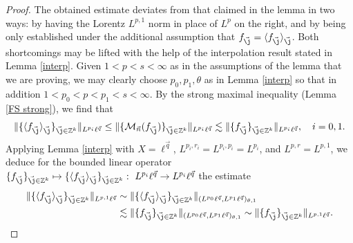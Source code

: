 \documentclass[10pt,a4paper]{amsart}
\newcommand{\Avee}[2]{\langle#1\rangle_{#2}}
\newcommand{\Norm}[2]{\|#1\|_{#2}}
\newcommand{\vj}{\vec{\textit{\j}}}
\newcommand{\vn}{\vec n}
\newcommand{\vq}{\vec q}
\begin{document}
\begin{proof}
The obtained estimate deviates from that claimed in the lemma in two ways: by having the Lorentz $L^{p,1}$ norm in place of $L^p$ on the right,
and by being only established under the additional assumption that $f_{\vj}=\Avee{f_{\vj} }{\vj}$. Both shortcomings may be lifted with the help of the interpolation result stated in Lemma \ref{interp}. Given $1<p<s<\infty$ as in the assumptions of the lemma that we are proving, we may clearly choose $p_0,p_1,\theta$ as in Lemma \ref{interp} so that in addition $1<p_0<p<p_1<s<\infty$. By the strong maximal inequality (Lemma \ref{FS strong}), we find that
\begin{equation*}
\Norm{\{\Avee{f_{\vj}}{\vj}\}_{\vj\in\mathbb Z^k}}{L^{p_i}\ell^{\vq}}
\leq \Norm{\{\mathcal M_{\vn}(f_{\vj})\}_{\vj\in\mathbb Z^k}}{L^{p_i}\ell^{\vq}}
\lesssim\Norm{\{f_{\vj}\}_{\vj\in\mathbb Z^k}}{L^{p_i}\ell^{\vq}},\quad i=0,1.
\end{equation*}
Applying Lemma \ref{interp} with $X=\ell^{\vq}$, $L^{p_i,r_i}=L^{p_i,p_i}=L^{p_i}$, and $L^{p,r}=L^{p,1}$, we deduce for the bounded linear operator $\{f_{\vj}\}_{\vj\in\mathbb Z^k}\mapsto\{\Avee{f_{\vj}}{\vj}\}_{\vj\in\mathbb Z^k}:\ L^{p_i}\ell^{\vq}\to L^{p_i}\ell^{\vq}$ the estimate
\begin{equation}\label{carl 13}
\begin{split}
\Norm{\{\Avee{f_{\vj}}{\vj}\}_{\vj\in\mathbb Z^k}}{L^{p,1}\ell^{\vq}}
&\sim\Norm{\{\Avee{f_{\vj}}{\vj}\}_{\vj\in\mathbb Z^k}}{(L^{p_0}\ell^{\vq},L^{p_1}\ell^{\vq})_{\theta,1}} \\
&\lesssim\Norm{\{f_{\vj}\}_{\vj\in\mathbb Z^k}}{(L^{p_0}\ell^{\vq},L^{p_1}\ell^{\vq})_{\theta,1}}
\sim\Norm{\{f_{\vj}\}_{\vj\in\mathbb Z^k}}{L^{p,1}\ell^{\vq}}.
\end{split}
\end{equation}


\end{proof}
\end{document}
